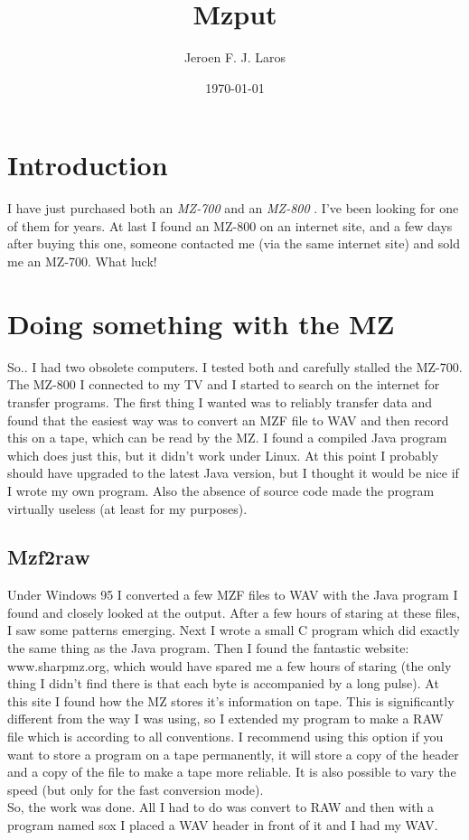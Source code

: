 \title{\Huge Mzput}
\author{Jeroen F. J. Laros}
\date{\today}
\frenchspacing
\linethickness{1pt}


\maketitle
\newpage

\tableofcontents
\newpage

\section{Introduction}
I have just purchased both an \emph{MZ-700} and an \emph{MZ-800} \cite{MZ}. 
I've been looking for one 
of them for years. At last I found an MZ-800 on an internet site, and a few 
days after buying this one, someone contacted me (via the same internet site)
and sold me an MZ-700. What luck!

\section{Doing something with the MZ}
So.. I had two obsolete computers. I tested both and carefully stalled the
MZ-700. The MZ-800 I connected to my TV and I started to search on the internet
for transfer programs. The first thing I wanted was to reliably transfer data
and found that the easiest way was to convert an MZF file to WAV and then 
record this on a tape, which can be read by the MZ. I found a compiled Java
program which does just this, but it didn't work under Linux. At this point
I probably should have upgraded to the latest Java version, but I thought it
would be nice if I wrote my own program. Also the absence of source code made
the program virtually useless (at least for my purposes).

\subsection{Mzf2raw}
Under Windows 95 I converted a few MZF files to WAV with the Java program I
found and closely looked at the output. After a few hours of staring at these
files, I saw some patterns emerging. Next I wrote a small C program which did
exactly the same thing as the Java program. Then I found the fantastic website:
www.sharpmz.org, which would have spared me a few hours of staring (the only
thing I didn't find there is that each byte is accompanied by a long pulse).
At this site I found how the MZ stores it's information on tape. This is
significantly different from the way I was using, so I extended my program to
make a RAW file which is according to all conventions. I recommend using this
option if you want to store a program on a tape permanently, it will store a
copy of the header and a copy of the file to make a tape more reliable. It is
also possible to vary the speed (but only for the fast conversion mode). \\
So, the work was done. All I had to do was convert to RAW and then with a
program named sox I placed a WAV header in front of it and I had my WAV.

